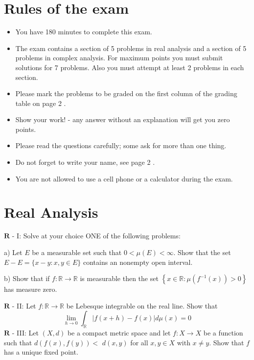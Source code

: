 \documentclass[10pt]{article}
\begin{document}
\section{Rules of the exam}
\begin{itemize}
  \item You have 180 minutes to complete this exam.

  \item The exam contains a section of 5 problems in real analysis and a section of 5 problems in complex analysis. For maximum points you must submit solutions for 7 problems. Also you must attempt at least 2 problems in each section.

  \item Please mark the problems to be graded on the first column of the grading table on page 2 .

  \item Show your work! - any answer without an explanation will get you zero points.

  \item Please read the questions carefully; some ask for more than one thing.

  \item Do not forget to write your name, see page 2 .

  \item You are not allowed to use a cell phone or a calculator during the exam.

\end{itemize}
\section{Real Analysis}
$\mathbf{R}$ - I: Solve at your choice ONE of the following problems:

a) Let $E$ be a measurable set such that $0<\mu(E)<\infty$. Show that the set $E-E=\{x-y: x, y \in E\}$ contains an nonempty open interval.

b) Show that if $f: \mathbb{R} \rightarrow \mathbb{R}$ is measurable then the set $\left\{x \in \mathbb{R}: \mu\left(f^{-1}(x)\right)>0\right\}$ has measure zero.

$\mathbf{R}$ - II: Let $f: \mathbb{R} \rightarrow \mathbb{R}$ be Lebesque integrable on the real line. Show that
$$
\lim _{h \rightarrow 0} \int_{\mathbb{R}}|f(x+h)-f(x)| d \mu(x)=0
$$
$\mathbf{R}$ - III: Let $(X, d)$ be a compact metric space and let $f: X \rightarrow X$ be a function such that $d(f(x), f(y))<$ $d(x, y)$ for all $x, y \in X$ with $x \neq y$. Show that $f$ has a unique fixed point.
\end{document}
